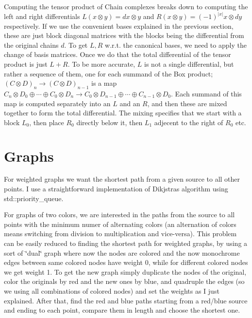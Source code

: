 Computing the tensor product of Chain complexes breaks down to computing the left and right differentials $L(x\otimes y)=dx\otimes y$ and $R(x\otimes y)=(-1)^{|x|}x\otimes dy$ respectively. If we use the convenient bases explained in the previous section, these are just block diagonal matrices with the blocks being the differential from the original chains $d$. To get $L,R$ w.\+r.\+t. the canonical bases, we need to apply the change of basis matrices. Once we do that the total differential of the tensor product is just $L+R$. To be more accurate, $L$ is not a single differential, but rather a sequence of them, one for each summand of the Box product; $(C\otimes D)_n\to (C\otimes D)_{n-1}$ is a map $C_n\otimes D_0\oplus\cdots \oplus C_0\otimes D_n\to C_0\otimes D_{n-1}\oplus\cdots\oplus C_{n-1}\otimes D_0$. Each summand of this map is computed separately into an $L$ and an $R$, and then these are mixed together to form the total differential. The mixing specifies that we start with a block $ L_0$, then place $ R_0$ directly below it, then $L_1$ adjecent to the right of $ R_0$ etc.\hypertarget{algo_graph}{}\section{Graphs}\label{algo_graph}

\begin{DoxyItemize}
\item For weighted graphs we want the shortest path from a given source to all other points. I use a straightforward implementation of Dikjstra\textquotesingle{}s algorithm using std\+::priority\+\_\+queue.
\item For graphs of two colors, we are interested in the paths from the source to all points with the minimum numer of alternating colors (an alternation of colors means switching from division to multiplication and vice-\/versa). This problem can be easily reduced to finding the shortest path for weighted graphs, by using a sort of \char`\"{}dual\char`\"{} graph where now the nodes are colored and the now monochrome edges between same colored nodes have weight 0, while for different colored nodes we get weight 1. To get the new graph simply duplicate the nodes of the original, color the originals by red and the new ones by blue, and quadruple the edges (so we using all combinations of colored nodes) and set the weights as I just explained. After that, find the red and blue paths starting from a red/blue source and ending to each point, compare them in length and choose the shortest one. 
\end{DoxyItemize}